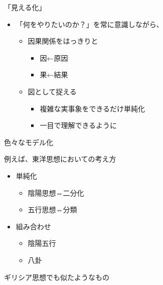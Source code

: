 \begin{frame}

\begin{block}{「見える化」}

\begin{itemize}

\item
  「何をやりたいのか？」を常に意識しながら、

  \begin{itemize}
  
  \item
    因果関係をはっきりと

    \begin{itemize}
    
    \item
      因←原因\\
    \item
      果←結果
    \end{itemize}
  \item
    図として捉える

    \begin{itemize}
    
    \item
      複雑な実事象をできるだけ単純化
    \item
      一目で理解できるように
    \end{itemize}
  \end{itemize}
\end{itemize}

\end{block}

\end{frame}

\begin{frame}

\begin{block}{色々なモデル化}

例えば、東洋思想においての考え方

\begin{itemize}

\item
  単純化

  \begin{itemize}
  
  \item
    陰陽思想⇔二分化
  \item
    五行思想⇔分類
  \end{itemize}
\item
  組み合わせ

  \begin{itemize}
  
  \item
    陰陽五行
  \item
    八卦
  \end{itemize}
\end{itemize}

ギリシア思想でも似たようなもの

\end{block}

\end{frame}

